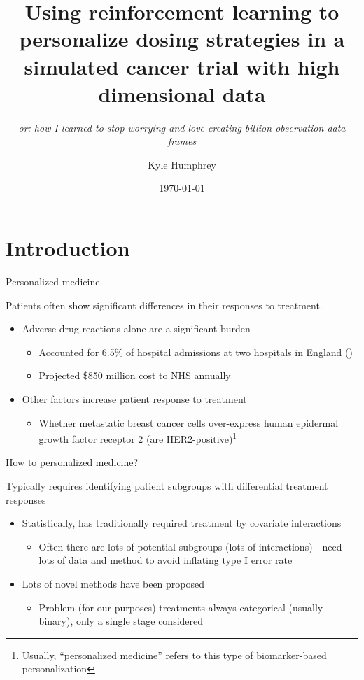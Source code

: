 \documentclass[10pt]{beamer}
\title{Using reinforcement learning to personalize dosing strategies in a simulated cancer trial with high dimensional data}
\subtitle{\sl or: how I learned to stop worrying and love creating billion-observation data frames}
\date{\today}
\author{Kyle Humphrey}
\institute{University of Arizona}
\begin{document}
\maketitle


\section{Introduction}

\begin{frame}[c]{Personalized medicine}

Patients often show significant differences in their responses to treatment.
\begin{itemize}%
  \item Adverse drug reactions alone are a significant burden 
  \begin{itemize}
    \item Accounted for 6.5\% of hospital admissions at two hospitals in England  (\cite{Pirmohamed2004})
    \item Projected \$850 million cost to NHS annually 
  \end{itemize}
  \item Other factors increase patient response to treatment
  \begin{itemize}
    \item Whether metastatic breast cancer cells over-express human epidermal growth factor receptor 2 (are HER2-positive)\footnote{Usually, ``personalized medicine'' refers to this type of biomarker-based personalization}
  \end{itemize}
\end{itemize}

\end{frame}

\begin{frame}[c]{How to personalized medicine?}

Typically requires identifying patient subgroups with differential treatment responses
\begin{itemize}[<+->]
  \item Statistically, has traditionally required treatment by covariate interactions
  \begin{itemize}
    \item Often there are lots of potential subgroups (lots of interactions) - need lots of data and method to avoid inflating type I error rate
  \end{itemize}
  \item Lots of novel methods have been proposed
  \begin{itemize}
    \item Problem (for our purposes) treatments always categorical (usually binary), only a single stage considered
  \end{itemize}
\end{itemize}

\end{frame}
\end{document}
